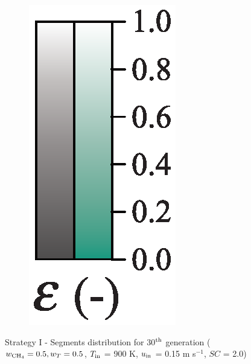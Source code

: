 \documentclass[preprint,12pt]{elsarticle}
\begin{document}
\begin{figure}
\begin{subfigure}[b]{0.1\textwidth}
     	\includegraphics[width=\textwidth]{segments_porosity.eps}
     \end{subfigure}
\caption{\label{fig:30L5050-seg} Strategy I - Segments distribution for 30$^{\rm{th}}$ generation ($w_{\rm{CH_4}} = 0.5, w_T = 0.5$, $T_{\rm{in}}$ = 900 K, $u_{\rm{in}}$ = 0.15 m s$^{-1}$, $SC$ = 2.0)}
\end{figure}
\end{document}
